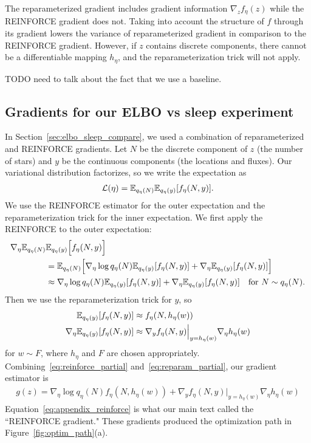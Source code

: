 The reparameterized gradient includes gradient information $\nabla_z f_\eta(z)$ while the REINFORCE gradient does not. Taking into account the structure of $f$ through its gradient lowers the variance of reparameterized gradient in comparison to the REINFORCE gradient.
However, if $z$ contains discrete components, there cannot be a differentiable mapping $h_\eta$, and the reparameterization trick will not apply.

TODO need to talk about the fact that we use a baseline. 

\subsection{Gradients for our ELBO vs sleep experiment}
In Section~\ref{sec:elbo_sleep_compare}, we used a combination of reparameterized and REINFORCE gradients.
Let $N$ be the discrete component of $z$ (the number of stars) and $y$ be the continuous components (the locations and fluxes).
Our variational distribution factorizes, so we write the expectation as
\begin{align}
 \mathcal{L}(\eta) = \mathbb{E}_{q_\eta(N)}\mathbb{E}_{q_\eta(y)}[f_\eta(N, y)].
 \label{eq:elbo_factorized}
\end{align}
We use the REINFORCE estimator for the outer expectation and the reparameterization trick for the inner expectation. We first apply the REINFORCE to the outer expectation:
\begin{align}
    \nabla_\eta  \mathbb{E}_{q_\eta(N)}&\mathbb{E}_{q_\eta(y)}\Big[f_\eta(N, y)\Big] \\
    &=  \mathbb{E}_{q_\eta(N)}\Big[ \nabla_\eta \log q_\eta(N) \mathbb{E}_{q_\eta(y)}[f_\eta(N, y)] +
    \nabla_\eta \mathbb{E}_{q_\eta(y)}[f_\eta(N, y)] \Big]\\
    &\approx \nabla_\eta \log q_\eta(N) \mathbb{E}_{q_\eta(y)}[f_\eta(N, y)] +
    \nabla_\eta \mathbb{E}_{q_\eta(y)}[f_\eta(N, y)] \quad \text{for } N \sim q_\eta(N).
    \label{eq:reinforce_partial}
\end{align}
Then we use the reparameterization trick for $y$, so
\begin{align}
    \mathbb{E}_{q_\eta(y)}[f_\eta(N, y)] &\approx f_\eta(N, h_\eta(w))\\
    \nabla_\eta \mathbb{E}_{q_\eta(y)}[f_\eta(N, y)] &\approx  \nabla_y f_\eta(N, y)\Big|_{y = h_\eta(w)}
    \nabla_\eta h_\eta(w)
    \label{eq:reparam_partial}
\end{align}
for $w \sim F$, where $h_\eta$ and $F$ are chosen appropriately. Combining~\eqref{eq:reinforce_partial} and~\eqref{eq:reparam_partial}, our gradient estimator is
\begin{align}
    g(z) = \nabla_\eta \log q_\eta(N)
    f_\eta(N, h_\eta(w)) +
    \nabla_y f_\eta(N, y)\Big|_{y = h_\eta(w)}
    \nabla_\eta h_\eta(w)
    \label{eq:appendix_reinforce}
\end{align}
Equation~\ref{eq:appendix_reinforce} is what our main text called the ``REINFORCE gradient."
These gradients produced the optimization path in Figure~\ref{fig:optim_path}(a).

